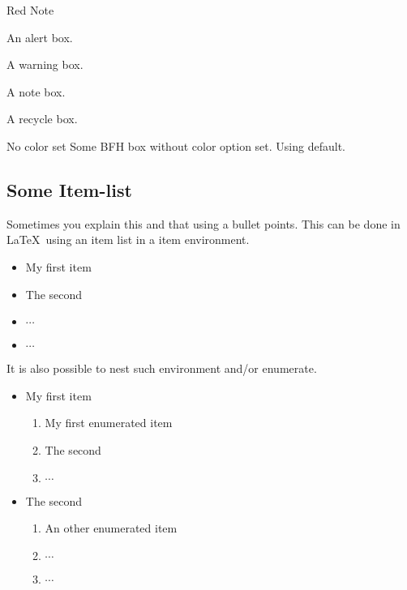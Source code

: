 \begin{bfhBox}{Red}
	Note\\
\end{bfhBox}

\blindtext[2]

\begin{bfhAlertBox}
  An alert box.
\end{bfhAlertBox}

\begin{bfhWarnBox}
  A warning box.
\end{bfhWarnBox}

\begin{bfhNoteBox}
  A note box.
\end{bfhNoteBox}

\begin{bfhRecycleBox}
  A recycle box.
\end{bfhRecycleBox}


\begin{bfhBox}{No color set}
	Some BFH box without color option set. Using default.\\
\end{bfhBox}


\blindtext[3]


\subsection{Some Item-list}
Sometimes you explain this and that using a bullet points.
This can be done in \LaTeX\ using an item list in a item environment.

\begin{itemize}
\item My first item
\item The second
\item $\cdots$
\item $\cdots$
\end{itemize}

It is also possible to nest such environment and/or enumerate.
\begin{itemize}
\item My first item
\begin{enumerate}
\item My first enumerated item
\item The second
\item $\cdots$
\end{enumerate}
\item The second
\begin{enumerate}
\item An other enumerated item
\item $\cdots$
\item $\cdots$
\end{enumerate}
\end{itemize}


